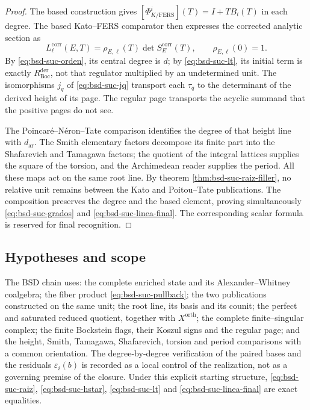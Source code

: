\begin{proof}
The based construction gives
\([\Phi_{K/\mathrm{FERS}}^i](T)=I+TB_i(T)\) in each degree. The based
Kato--FERS comparator then expresses the corrected analytic section
as
\begin{equation}\label{eq:bsd-suc-fers}
 L_{\ell}^{\mathrm{corr}}(E,T)
 =\rho_{E,\ell}(T)\det S_E^{\mathrm{corr}}(T),
 \qquad \rho_{E,\ell}(0)=1.
\end{equation}
By \eqref{eq:bsd-suc-orden}, its central degree is \(d\); by
\eqref{eq:bsd-suc-lt}, its initial term is exactly
\(R_{\mathrm{Boc}}^{\mathrm{der}}\), not that regulator multiplied by an
undetermined unit. The isomorphisms \(j_q\) of
\eqref{eq:bsd-suc-jq} transport each \(\tau_q\) to the determinant of the
derived height of its page. The regular page transports the acyclic
summand that the positive pages do not see.

The Poincaré--Néron--Tate comparison identifies the degree of that height
line with \(d_{\mathrm{ar}}\). The Smith elementary factors decompose its
finite part into the Shafarevich and Tamagawa factors; the quotient of the integral
lattices supplies the square of the torsion, and the Archimedean reader supplies
the period. All these maps act on the same root line. By
theorem \ref{thm:bsd-suc-raiz-filler}, no relative unit remains between
the Kato and Poitou--Tate publications. The composition preserves the degree and
the based element, proving simultaneously
\eqref{eq:bsd-suc-grados} and \eqref{eq:bsd-suc-linea-final}. The corresponding scalar
formula is reserved for final recognition.
\end{proof}

\subsection*{Hypotheses and scope}

The BSD chain uses: the complete enriched state and its Alexander--Whitney
coalgebra; the fiber product \eqref{eq:bsd-suc-pullback}; the two
publications constructed on the same unit; the root line, its basis and its
counit; the perfect and saturated reduced quotient, together with
\(X^{\mathrm{orth}}\); the complete finite--singular complex; the finite
Bockstein flags, their Koszul signs and the regular page; and the
height, Smith, Tamagawa, Shafarevich, torsion and period comparisons
with a common orientation. The degree-by-degree verification of the paired
bases and the residuals \(\varepsilon_i(b)\) is recorded as a
local control of the realization, not as a governing premise of the closure.
Under this explicit starting structure,
\eqref{eq:bsd-suc-raiz}, \eqref{eq:bsd-suc-hstar},
\eqref{eq:bsd-suc-lt} and \eqref{eq:bsd-suc-linea-final} are exact
equalities.

